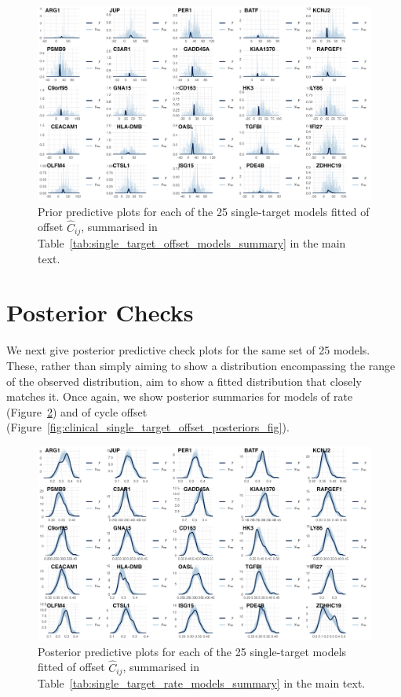 \documentclass[../thesis.tex]{subfiles}
\begin{document}
\begin{figure}[!ht]
    \centering
    \includegraphics[width=\textwidth]{figures/chapter2/clinical_single_target_offset_priors_fig.png}
    \caption{Prior predictive plots for each of the 25 single-target models fitted of offset $\hat{C}_{ij}$, summarised in Table~\ref{tab:single_target_offset_models_summary} in the main text.}
    \label{fig:clinical_single_target_offset_priors_fig}
\end{figure}





\newpage
\newpage
\section{Posterior Checks}
We next give posterior predictive check plots for the same set of 25 models. These, rather than simply aiming to show a distribution encompassing the range of the observed distribution, aim to show a fitted distribution that closely matches it. Once again, we show posterior summaries for models of rate (Figure~\ref{fig:clinical_single_target_rate_posteriors_fig}) and of cycle offset (Figure~\ref{fig:clinical_single_target_offset_posteriors_fig}).



\begin{figure}
    \centering
    \includegraphics[width=\textwidth]{figures/chapter2/clinical_single_target_rate_posteriors_fig.png}
    \caption{Posterior predictive plots for each of the 25 single-target models fitted of offset $\hat{C}_{ij}$, summarised in Table~\ref{tab:single_target_rate_models_summary} in the main text.}
    \label{fig:clinical_single_target_rate_posteriors_fig}
\end{figure}
\end{document}
